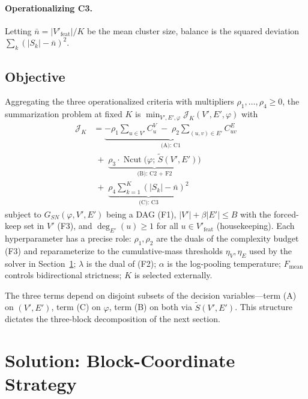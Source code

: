 \documentclass[table, 11pt]{article}
\DeclareMathOperator{\Ncut}{Ncut}
\begin{document}
\paragraph{Operationalizing C3.}
Letting $\bar n = |V'_{\text{feat}}|/K$ be the mean cluster size,
balance is the squared deviation $\sum_k (|S_k| - \bar n)^2$.

\subsection{Objective}\label{sec:objective}

Aggregating the three operationalized criteria with multipliers
$\rho_1, \ldots, \rho_4 \ge 0$, the summarization problem at fixed
$K$ is $\min_{V', E', \varphi} \mathcal{J}_K(V', E', \varphi)$ with
\begin{align}
\mathcal{J}_K &= \underbrace{-\rho_1 \!\!\sum_{u \in V'}\!\! C^V_u
\;-\; \rho_2 \!\!\!\sum_{(u,v) \in E'}\!\!\!\! C^E_{uv}}_{\text{(A): C1}}
\nonumber\\[1pt]
&\;+\; \underbrace{\rho_3 \cdot \Ncut\bigl(\varphi;\, \tilde S(V', E')\bigr)}_{\text{(B): C2 + F2}}
\nonumber\\[1pt]
&\;+\; \underbrace{\rho_4 \!\sum_{k=1}^K (|S_k| - \bar n)^2}_{\text{(C): C3}}
\label{eq:objective}
\end{align}
subject to $G_{SN}(\varphi, V', E')$ being a DAG (F1),
$|V'| + \beta|E'| \le B$ with the forced-keep set in $V'$ (F3), and
$\deg_{E'}(u) \ge 1$ for all $u \in V'_{\text{feat}}$ (housekeeping).
Each hyperparameter has a precise role: $\rho_1, \rho_2$ are the
duals of the complexity budget (F3) and reparameterize to the
cumulative-mass thresholds $\eta_V, \eta_E$ used by the solver in
Section~\ref{sec:solution}; $\lambda$ is the dual of (F2); $\alpha$
is the log-pooling temperature; $F_{\text{mean}}$ controls
bidirectional strictness; $K$ is selected externally.

The three terms depend on disjoint subsets of the decision
variables---term (A) on $(V', E')$, term (C) on $\varphi$, term (B)
on both via $\tilde S(V', E')$. This structure dictates the
three-block decomposition of the next section.

\section{Solution: Block-Coordinate Strategy}\label{sec:solution}


\end{document}
